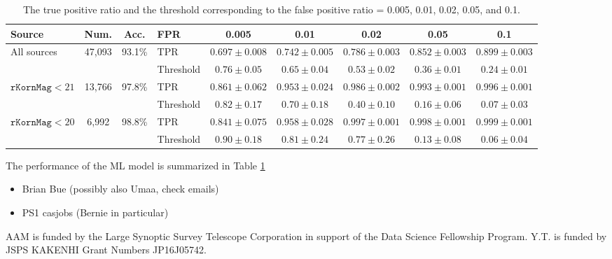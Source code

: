 \documentclass[twocolumn]{aastex62}
\begin{document}
\begin{table}
\begin{center}
\caption{The true positive ratio and the threshold 
corresponding to the false positive ratio = 0.005, 0.01, 0.02, 0.05, and 0.1. }
\label{tbl:fpr}
\begin{tabular}{lcc|lccccc}
\hline\hline
                 Source               & Num. & Acc. & FPR & 0.005 & 0.01 & 0.02 & 0.05 & 0.1 \\ \hline
\multirow{2}{*}{All sources} & \multirow{2}{*}{47,093} & \multirow{2}{*}{93.1\%} & 
                                              TPR  & $0.697 \pm 0.008$ &  $0.742 \pm 0.005$ & $0.786 \pm 0.003$ & $0.852 \pm 0.003$ & $0.899 \pm 0.003$  \\
\multicolumn{1}{l}{}                             & & & Threshold & $0.76 \pm 0.05$ &  $0.65 \pm 0.04$ & $0.53 \pm 0.02$ & $0.36 \pm 0.01$ & $0.24 \pm 0.01$  \\ \hline
\multirow{2}{*}{$\mathtt{rKornMag} < 21$} & \multirow{2}{*}{13,766} & \multirow{2}{*}{97.8\%} & 
                                              TPR  & $0.861 \pm 0.062$ &  $0.953 \pm 0.024$ & $0.986 \pm 0.002$ & $0.993 \pm 0.001$ & $0.996 \pm 0.001$ \\
                                                & & & Threshold & $0.82 \pm 0.17$ &  $0.70 \pm 0.18$ & $0.40 \pm 0.10$ & $0.16 \pm 0.06$ & $0.07 \pm 0.03$   \\ \hline
\multirow{2}{*}{$\mathtt{rKornMag} < 20$}  & \multirow{2}{*}{6,992}& \multirow{2}{*}{98.8\%} & 
                                              TPR  & $0.841 \pm 0.075$ &  $0.958 \pm 0.028$ & $0.997 \pm 0.001$ & $0.998 \pm 0.001$ & $0.999 \pm 0.001$  \\
                                                 & &  & Threshold & $0.90 \pm 0.18$ &  $0.81 \pm 0.24$ & $0.77 \pm 0.26$ & $0.13 \pm 0.08$ & $0.06 \pm 0.04$ \\ \hline
\end{tabular}
\end{center}
\end{table}

The performance of the ML model is summarized in Table \ref{tbl:fpr}

\acknowledgements

\begin{itemize}
    \item Brian Bue (possibly also Umaa, check emails)
    \item PS1 casjobs (Bernie in particular)
\end{itemize}

AAM is funded by the Large Synoptic Survey Telescope Corporation in support of
the Data Science Fellowship Program. 
Y.T. is funded by JSPS KAKENHI Grant Numbers JP16J05742. 




\appendix




\end{document}
